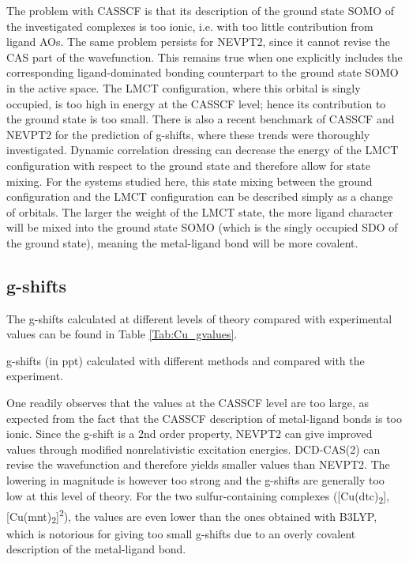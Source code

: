 The problem with CASSCF is that its description of the ground state SOMO of the investigated complexes is too ionic, i.e. with too little contribution from ligand AOs. The same problem persists for NEVPT2, since it cannot revise the CAS part of the wavefunction. This remains true when one explicitly includes the corresponding ligand-dominated bonding counterpart to the ground state SOMO in the active space. The LMCT configuration, where this orbital is singly occupied, is too high in energy at the CASSCF level; hence its contribution to the ground state is too small.\cite{GinerA_2015_124305} There is also a recent benchmark of CASSCF and NEVPT2 for the prediction of g-shifts,\cite{SinghAN_2018_4662} where these trends were thoroughly investigated. Dynamic correlation dressing can decrease the energy of the LMCT configuration with respect to the ground state and therefore allow for state mixing. For the systems studied here, this state mixing between the ground configuration and the LMCT configuration can be described simply as a change of orbitals. The larger the weight of the LMCT state, the more ligand character will be mixed into the ground state SOMO (which is the singly occupied SDO of the ground state), meaning the metal-ligand bond will be more covalent.

\subsection{g-shifts}
The g-shifts calculated at different levels of theory compared with experimental values can be found in Table \ref{Tab:Cu_gvalues}.
\begin{table}
\centering
\small
\caption[g-shifts calculated with different methods and compared with the experiment.]{g-shifts (in ppt) calculated with different methods and compared with the experiment.}
\label{Tab:Cu_gvalues}

\end{table}
One readily observes that the values at the CASSCF level are too large, as expected from the fact that the CASSCF description of metal-ligand bonds is too ionic. Since the g-shift is a 2nd order property, NEVPT2 can give improved values through modified nonrelativistic excitation energies. DCD-CAS(2) can revise the wavefunction and therefore yields smaller values than NEVPT2. The lowering in magnitude is however too strong and the g-shifts are generally too low at this level of theory. For the two sulfur-containing complexes ([Cu(dtc)\textsubscript{2}], [Cu(mnt)\textsubscript{2}]\textsuperscript{2\textminus}), the values are even lower than the ones obtained with B3LYP, which is notorious for giving too small g-shifts due to an overly covalent description of the metal-ligand bond.\cite{Neese_2001_11080}


